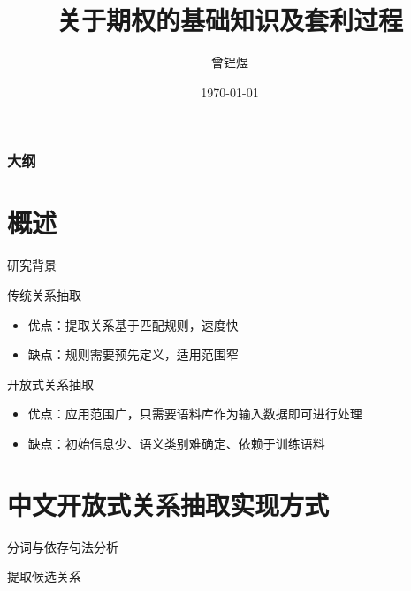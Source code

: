 \documentclass[12pt]{ctexbeamer}	%
\title[期权知识分享]{关于期权的基础知识及套利过程}	%
\author[Zengyu Zeng]{曾锃煜}
\institute[Hundsun]{资管研发四部}	%
\date{\today}
\begin{document}
\begin{frame}
\titlepage
\end{frame}


\begin{frame}
\frametitle{大纲}
\tableofcontents
\end{frame}


\section{概述}

\begin{frame}{研究背景}
  \begin{block}{传统关系抽取}
    \begin{itemize}
      \item 优点：提取关系基于匹配规则，速度快
      \item 缺点：规则需要预先定义，适用范围窄
    \end{itemize}
  \end{block}
  \pause
  \begin{block}{开放式关系抽取}
    \begin{itemize}
      \item 优点：应用范围广，只需要语料库作为输入数据即可进行处理
      \item 缺点：初始信息少、语义类别难确定、依赖于训练语料
    \end{itemize}
  \end{block}
\end{frame}


\section{中文开放式关系抽取实现方式}

\begin{frame}{分词与依存句法分析}

\end{frame}

\begin{frame}{提取候选关系}
\end{frame}
\end{document}

